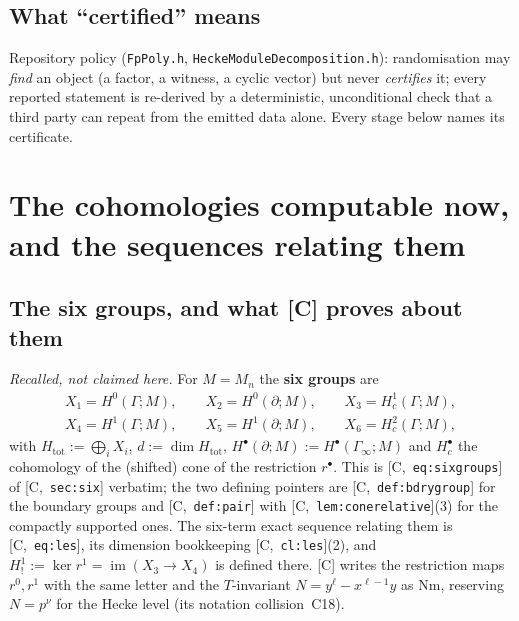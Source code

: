 \documentclass[11pt]{article}
\theoremstyle{remark}
\newcommand{\Ga}{\Gamma}
\DeclareMathOperator{\im}{im}
\newcommand{\Htot}{H_{\mathrm{tot}}}
\newcommand{\Mn}{M_n}
\newcommand{\HA}[1]{[C,~\texttt{#1}]}      %
\begin{document}
\subsection{What ``certified'' means}
Repository policy (\texttt{FpPoly.h}, \texttt{HeckeModuleDecomposition.h}): randomisation may
\emph{find} an object (a factor, a witness, a cyclic vector) but never \emph{certifies} it; every
reported statement is re-derived by a deterministic, unconditional check that a third party can
repeat from the emitted data alone. Every stage below names its certificate.

\section{The cohomologies computable now, and the sequences relating them}\label{sec:coh}

\subsection{The six groups, and what [C] proves about them}\label{sec:imported}
\emph{Recalled, not claimed here.} For $M=\Mn$ the \textbf{six groups} are
\begin{gather*}
X_1=H^0(\Ga;M),\qquad X_2=H^0(\partial;M),\qquad X_3=H^1_c(\Ga;M),\\
X_4=H^1(\Ga;M),\qquad X_5=H^1(\partial;M),\qquad X_6=H^2_c(\Ga;M),
\end{gather*}
with $\Htot:=\bigoplus_iX_i$, $d:=\dim\Htot$, $H^\bullet(\partial;M):=H^\bullet(\Ga_\infty;M)$
and $H^\bullet_c$ the cohomology of the (shifted) cone of the restriction $r^\bullet$. This is
\HA{eq:sixgroups} of \HA{sec:six} verbatim; the two defining pointers are \HA{def:bdrygroup}
for the boundary groups and \HA{def:pair} with \HA{lem:conerelative}(3) for the compactly
supported ones. The six-term exact sequence relating them is \HA{eq:les}, its dimension
bookkeeping \HA{cl:les}(2), and $H^1_!:=\ker r^1=\im(X_3\to X_4)$ is defined there. [C] writes
the restriction maps $r^0,r^1$ with the same letter and the $T$-invariant
$N=y^\ell-x^{\ell-1}y$ as $\mathrm{Nm}$, reserving $N=p^\nu$ for the Hecke level (its notation
collision~C18).
\end{document}
